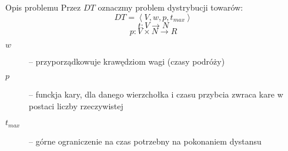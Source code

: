 \begin{block}{Opis problemu}
	Przez $DT$ oznaczmy problem dystrybucji towarów:
	\begin{equation}
		DT = \left< V, w, p, t_{max}\right>
	\end{equation}
	\begin{equation}
		t : V \rightarrow N
	\end{equation}
	\begin{equation}
		p : V \times N \rightarrow R
	\end{equation}
	\begin{description}
		\item[$w$] -- przyporządkowuje krawędziom wagi (czasy podróży)
		\item[$p$] -- funckja kary, dla danego wierzchołka i czasu przybcia zwraca kare w postaci liczby rzeczywistej
		\item[$t_{max}$] -- górne ograniczenie na czas potrzebny na pokonaniem dystansu
	\end{description}
\end{block}
